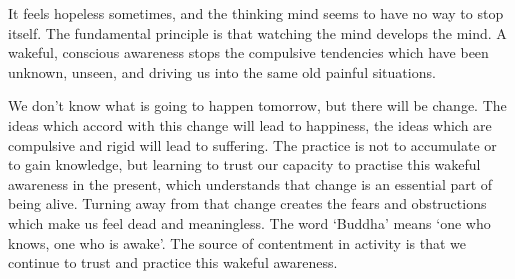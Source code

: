 It feels hopeless sometimes, and the thinking mind seems to have no way
to stop itself. The fundamental principle is that watching the mind
develops the mind. A wakeful, conscious awareness stops the compulsive
tendencies which have been unknown, unseen, and driving us into the same
old painful situations.

We don't know what is going to happen tomorrow, but there will be
change. The ideas which accord with this change will lead to happiness,
the ideas which are compulsive and rigid will lead to suffering. The
practice is not to accumulate or to gain knowledge, but learning to
trust our capacity to practise this wakeful awareness in the present,
which understands that change is an essential part of being alive.
Turning away from that change creates the fears and obstructions which
make us feel dead and meaningless. The word `Buddha' means `one who
knows, one who is awake'. The source of contentment in activity is that
we continue to trust and practice this wakeful awareness.

